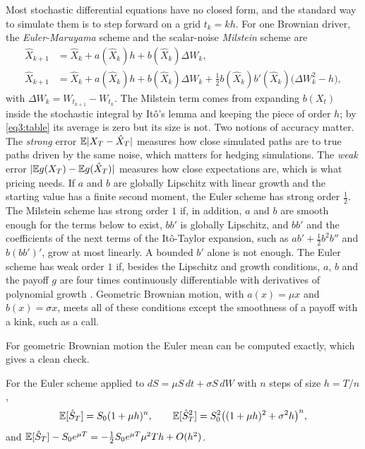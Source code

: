 \begin{chapterrefs}
Most stochastic differential equations have no closed form, and the standard way to simulate them is
to step forward on a grid $t_k=kh$. For one Brownian driver, the \emph{Euler-Maruyama} scheme and the scalar-noise \emph{Milstein} scheme are
\begin{align}
  \hat X_{k+1} &= \hat X_k + a(\hat X_k)h + b(\hat X_k)\Delta W_k, \label{eq3:euler}\\
  \hat X_{k+1} &= \hat X_k + a(\hat X_k)h + b(\hat X_k)\Delta W_k + \tfrac12 b(\hat X_k)b'(\hat X_k)\bigl(\Delta W_k^2-h\bigr), \label{eq3:milstein}
\end{align}
with $\Delta W_k=W_{t_{k+1}}-W_{t_k}$. The Milstein term comes from expanding $b(X_t)$ inside the
stochastic integral by It\^o's lemma and keeping the piece of order $h$; by \cref{eq3:table} its
average is zero but its size is not. Two notions of accuracy matter. The \emph{strong} error
$\mathbb{E}|X_T-\hat X_T|$ measures how close simulated paths are to true paths driven by the same noise, which
matters for hedging simulations. The \emph{weak} error $|\mathbb{E} g(X_T)-\mathbb{E} g(\hat X_T)|$ measures how close
expectations are, which is what pricing needs. If $a$ and $b$ are globally Lipschitz with linear growth
and the starting value has a finite second moment, the Euler scheme has strong order $\tfrac12$. The
Milstein scheme has strong order $1$ if, in addition, $a$ and $b$ are smooth enough for the terms below to
exist, $bb'$ is globally Lipschitz, and $bb'$ and the coefficients of the next terms of the It\^o-Taylor
expansion, such as $ab'+\tfrac12b^2b''$ and $b(bb')'$, grow at most linearly. A bounded $b'$ alone is not
enough. The Euler scheme has weak order $1$ if, besides the Lipschitz and growth conditions, $a$, $b$
and the payoff $g$ are four times continuously differentiable with derivatives of polynomial growth
\parencite{kloeden1992,higham2001}. Geometric Brownian motion, with $a(x)=\mu x$ and $b(x)=\sigma x$,
meets all of these conditions except the smoothness of a payoff with a kink, such as a call.

For geometric Brownian motion the Euler mean can be computed exactly, which gives a clean check.

\begin{proposition}\label{prop3:eulerweak}
For the Euler scheme applied to $dS=\mu S\,dt+\sigma S\,dW$ with $n$ steps of size $h=T/n$,
\begin{equation}\label{eq3:eulermean}
  \mathbb{E}[\hat S_T]=S_0(1+\mu h)^n,\qquad
  \mathbb{E}[\hat S_T^2]=S_0^2\bigl((1+\mu h)^2+\sigma^2h\bigr)^n,
\end{equation}
and $\mathbb{E}[\hat S_T]-S_0e^{\mu T}=-\tfrac12S_0e^{\mu T}\mu^2Th+O(h^2)$.
\end{proposition}


\end{chapterrefs}

